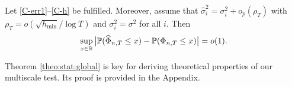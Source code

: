 \documentclass[a4paper,12pt]{article}
\newcommand{\doublehat}[1]{\skew{5.5}\widehat{\widehat{#1}}}
\newcommand{\doublehattwo}[1]{\widehat{\widehat{#1}}}
\begin{document}




\begin{theorem}\label{theo:stat:global}
Let \ref{C-err1}--\ref{C-h} be fulfilled. Moreover, assume that $\widehat{\sigma}_i^2 = \sigma^2_i + o_p(\rho_T)$ with $\rho_T = o(\sqrt{h_{\min}}/\log T)$ and $\sigma_i^2 = \sigma^2$ for all $i$. Then  
\begin{equation*}
\sup_{x \in \mathbb{R}} \big| \mathbb{P}(\widehat{\Phi}_{n, T} \le x) - \mathbb{P}(\Phi_{n,T} \le x) \big| = o(1).
\end{equation*}
\end{theorem}
Theorem \ref{theo:stat:global} is key for deriving theoretical properties of our multiscale test. Its proof is provided in the Appendix. 
\end{document}
